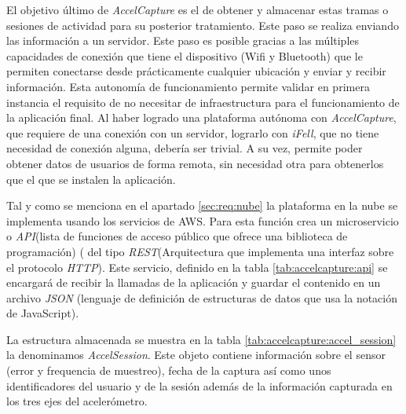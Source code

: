 El objetivo último de \textit{AccelCapture} es el de obtener y almacenar estas tramas o sesiones de actividad para su posterior tratamiento. Este paso se realiza enviando las información a un servidor. Este paso es posible gracias a las múltiples capacidades de conexión que tiene el dispositivo (Wifi y Bluetooth) que le permiten conectarse desde prácticamente cualquier ubicación y enviar y recibir información. Esta autonomía de funcionamiento permite validar en primera instancia el requisito de no necesitar de infraestructura para el funcionamiento de la aplicación final. Al haber logrado una plataforma autónoma con \textit{AccelCapture}, que requiere de una conexión con un servidor, lograrlo con \textit{iFell}, que no tiene necesidad de conexión alguna, debería ser trivial.
A su vez, permite poder obtener datos de usuarios de forma remota, sin necesidad otra para obtenerlos que el que se instalen la aplicación.

Tal y como se menciona en el apartado \ref{sec:req:nube} la plataforma en la nube se implementa usando los servicios de AWS. Para esta función crea un microservicio o \textit{API}(lista de funciones de acceso público que ofrece una biblioteca de programación) ( del tipo \textit{REST}(Arquitectura que implementa una interfaz sobre el protocolo \textit{HTTP}). Este servicio, definido en la tabla \ref{tab:accelcapture:api} se encargará de recibir la llamadas de la aplicación y guardar el contenido en un archivo \textit{JSON} (lenguaje de definición de estructuras de datos que usa la notación de JavaScript).


La estructura almacenada se muestra en la tabla \ref{tab:accelcapture:accel_session} la denominamos \textit{AccelSession}. Este objeto contiene información sobre el sensor (error y frequencia de muestreo), fecha de la captura así como unos identificadores del usuario y de la sesión además de la información capturada en los tres ejes del acelerómetro.



